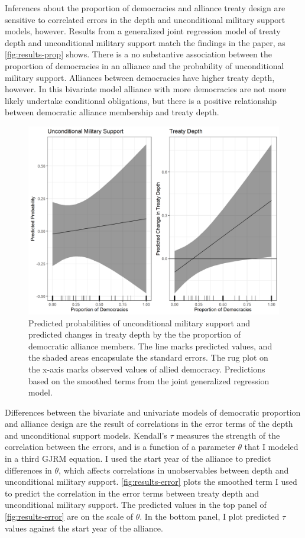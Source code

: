 \documentclass[12pt]{article}
\begin{document}
Inferences about the proportion of democracies and alliance treaty design are sensitive to correlated errors in the depth and unconditional military support models, however. 
Results from a generalized joint regression model of treaty depth and unconditional military support match the findings in the paper, as \autoref{fig:results-prop} shows. 
There is a no substantive association between the proportion of democracies in an alliance and the probability of unconditional military support. 
Alliances between democracies have higher treaty depth, however. 
In this bivariate model alliance with more democracies are not more likely undertake conditional obligations, but there is a positive relationship between democratic alliance membership and treaty depth. 


\begin{figure}
\includegraphics[width=.95\textwidth]{results-prop.png}  
\caption{Predicted probabilities of unconditional military support and predicted changes in treaty depth by the the proportion of democratic alliance members. The line marks predicted values, and the shaded areas encapsulate the standard errors. The rug plot on the x-axis marks observed values of allied democracy. Predictions based on the smoothed terms from the joint generalized regression model.}
\label{fig:results-prop}
\end{figure}



Differences between the bivariate and univariate models of democratic proportion and alliance design are the result of correlations in the error terms of the depth and unconditional support models.  
Kendall's $\tau$ measures the strength of the correlation between the errors, and is a function of a parameter $\theta$ that I modeled in a third GJRM equation.
I used the start year of the alliance to predict differences in $\theta$, which affects correlations in unobservables between depth and unconditional military support. 
\autoref{fig:results-error} plots the smoothed term I used to predict the correlation in the error terms between treaty depth and unconditional military support. 
The predicted values in the top panel of \autoref{fig:results-error} are on the scale of $\theta$. 
In the bottom panel, I plot predicted $\tau$ values against the start year of the alliance. 
\end{document}

